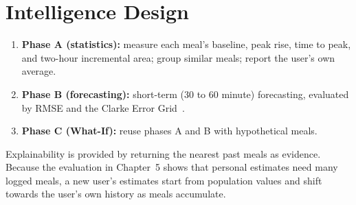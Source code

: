 \section{Intelligence Design}
\begin{enumerate}
  \item \textbf{Phase A (statistics):} measure each meal's baseline, peak rise, time to peak, and two-hour incremental area; group similar meals; report the user's own average.
  \item \textbf{Phase B (forecasting):} short-term (30 to 60 minute) forecasting, evaluated by RMSE and the Clarke Error Grid~\cite{clarke1987}.
  \item \textbf{Phase C (What-If):} reuse phases A and B with hypothetical meals.
\end{enumerate}
Explainability is provided by returning the nearest past meals as evidence. Because the evaluation in Chapter~5 shows that personal estimates need many logged meals, a new user's estimates start from population values and shift towards the user's own history as meals accumulate.
